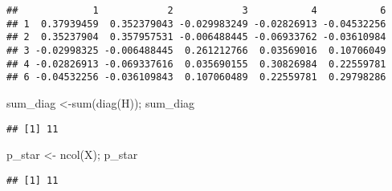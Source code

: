 \documentclass[
]{article}
\newenvironment{Shaded}{\begin{snugshade}}{\end{snugshade}}
\newcommand{\AttributeTok}[1]{\textcolor[rgb]{0.77,0.63,0.00}{#1}}
\newcommand{\ConstantTok}[1]{\textcolor[rgb]{0.00,0.00,0.00}{#1}}
\newcommand{\DecValTok}[1]{\textcolor[rgb]{0.00,0.00,0.81}{#1}}
\newcommand{\FloatTok}[1]{\textcolor[rgb]{0.00,0.00,0.81}{#1}}
\newcommand{\FunctionTok}[1]{\textcolor[rgb]{0.00,0.00,0.00}{#1}}
\newcommand{\NormalTok}[1]{#1}
\newcommand{\OtherTok}[1]{\textcolor[rgb]{0.56,0.35,0.01}{#1}}
\newcommand{\SpecialCharTok}[1]{\textcolor[rgb]{0.00,0.00,0.00}{#1}}
\newcommand{\StringTok}[1]{\textcolor[rgb]{0.31,0.60,0.02}{#1}}
\begin{document}
\begin{verbatim}
##             1            2            3           4           6
## 1  0.37939459  0.352379043 -0.029983249 -0.02826913 -0.04532256
## 2  0.35237904  0.357957531 -0.006488445 -0.06933762 -0.03610984
## 3 -0.02998325 -0.006488445  0.261212766  0.03569016  0.10706049
## 4 -0.02826913 -0.069337616  0.035690155  0.30826984  0.22559781
## 6 -0.04532256 -0.036109843  0.107060489  0.22559781  0.29798286
\end{verbatim}

\begin{Shaded}
\begin{Highlighting}[]
\NormalTok{sum\_diag }\OtherTok{\textless{}{-}}\FunctionTok{sum}\NormalTok{(}\FunctionTok{diag}\NormalTok{(H)); sum\_diag}
\end{Highlighting}
\end{Shaded}

\begin{verbatim}
## [1] 11
\end{verbatim}

\begin{Shaded}
\begin{Highlighting}[]
\NormalTok{p\_star }\OtherTok{\textless{}{-}} \FunctionTok{ncol}\NormalTok{(X); p\_star}
\end{Highlighting}
\end{Shaded}

\begin{verbatim}
## [1] 11
\end{verbatim}

\begin{Shaded}
\end{Shaded}
\end{document}
